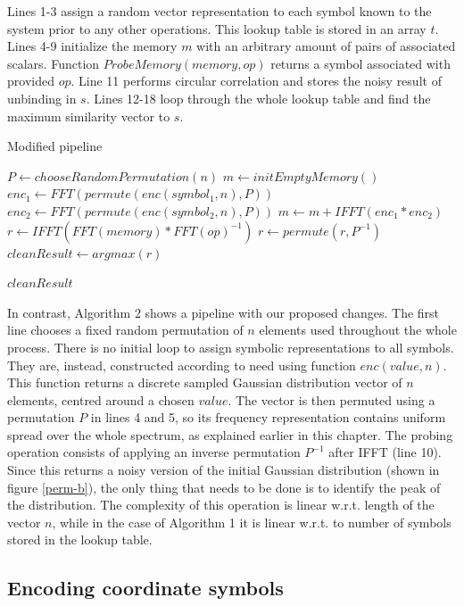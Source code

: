 \documentclass[journal]{journal}
\begin{document}
	
	Lines 1-3 assign a random vector representation to each symbol known to the system prior to any other operations. This lookup table is stored in an array $t$. Lines 4-9 initialize the memory $m$ with an arbitrary amount of pairs of associated scalars. Function $ProbeMemory(memory, op)$ returns a symbol associated with provided $op$. Line 11 performs circular correlation and stores the noisy result of unbinding in $s$. Lines 12-18 loop through the whole lookup table and find the maximum similarity vector to $s$.
		
		\begin{algorithm}
			\caption{Modified pipeline}
			\begin{algorithmic}[1]
				\State $P \gets chooseRandomPermutation(n)$
				\State $m \gets initEmptyMemory()$
				\State $enc_1 \gets FFT(permute(enc(symbol_1, n), P))$
				\State $enc_2 \gets FFT(permute(enc(symbol_2, n), P))$
				\State $m \gets m + IFFT(enc_1 * enc_2)$
				\EndFor	
				\State $r \gets IFFT(FFT(memory) * FFT(op)^{-1})$
				\State $r \gets permute(r, P^{-1})$
				\State $cleanResult \gets argmax(r)$
				
				\Return $cleanResult$
				\EndFunction
			\end{algorithmic}
		\end{algorithm}
		
		In contrast, Algorithm 2 shows a pipeline with our proposed changes. The first line chooses a fixed random permutation of $n$ elements used throughout the whole process. There is no initial loop to assign symbolic representations to all symbols. They are, instead, constructed according to need using function $enc(value, n)$. This function returns a discrete sampled Gaussian distribution vector of $n$ elements, centred around a chosen $value$. The vector is then permuted using a permutation $P$ in lines 4 and 5, so its frequency representation contains uniform spread over the whole spectrum, as explained earlier in this chapter. The probing operation consists of applying an inverse permutation $P^{-1}$ after IFFT (line 10). Since this returns a noisy version of the initial Gaussian distribution (shown in figure \ref{perm-b}), the only thing that needs to be done is to identify the peak of the distribution. The complexity of this operation is linear w.r.t. length of the vector $n$, while in the case of Algorithm 1 it is linear w.r.t. to number of symbols stored in the lookup table.
		

	\subsection{Encoding coordinate symbols}
			
\end{document}
